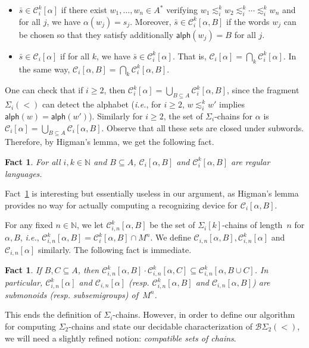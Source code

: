 \documentclass[envcountsame]{llncs}
\newcommand\nat{\ensuremath{\mathbb{N}}\xspace}
\newcommand\Cs{\ensuremath{\mathcal{C}}\xspace}
\newcommand\Csik{\ensuremath{\Cs_i^k}\xspace}
\newcommand\Csi{\ensuremath{\Cs_i}\xspace}
\newcommand\Csikn{\ensuremath{\Cs_{i,n}^k}\xspace}
\newcommand\Csin{\ensuremath{\Cs_{i,n}}\xspace}
\newcommand{\sic}[1]{\ensuremath{\Sigma_{#1}}\xspace}
\newcommand{\bswd}{\ensuremath{\mathcal{B}\Sigma_{2}(<)}\xspace}
\newcommand{\siwi}{\ensuremath{\Sigma_{i}(<)}\xspace}
\newcommand\sieq[2]{\ensuremath{\lesssim^{#1}_{#2}}\xspace}
\newcommand\ksieq[1]{\sieq{k}{#1}}
\let\geq\geqslant
\newcommand\content[1]{\ensuremath{\contentmorphism(#1)}}
\newcommand\contentmorphism{\ensuremath{\textsf{alph}}}
\newcommand\chains{chains\xspace}
\newcommand\qchains[1]{\ensuremath{\sic{#1}}-chains\xspace}
\newcommand\qpchains[2]{\ensuremath{\sic{#1}[#2]}-chains\xspace}
\newcommand\ichains{\qchains{i}}
\newcommand\dchains{\qchains{2}}
\newcommand\ikchains{\qpchains{i}{k}}
\newtheorem{fact}[theorem]{Fact}
\begin{document}
\begin{itemize}
\item $\bar{s} \in \Csik[\alpha]$ if there exist $w_1,\dots,w_n \in A^*$
  verifying $w_1 \ksieq{i} w_2 \ksieq{i} \cdots \ksieq{i} w_n$ and for all
  $j$, we have $\alpha(w_j)=s_j$. Moreover, $\bar{s} \in \Csik[\alpha,B]$ if
  the words $w_j$ can be chosen so that they satisfy additionally
  $\content{w_j}=B$ for all $j$.
\item $\bar{s} \in \Csi[\alpha]$ if for all $k$, we have $\bar{s} \in
  \Csik[\alpha]$. That is, $\Csi[\alpha]=\bigcap_k\Csik[\alpha]$. In the same
  way, $\Csi[\alpha,B]=\bigcap_k\Csik[\alpha,B]$.
\end{itemize}

One can check that if $i\geq2$, then
$\Csik[\alpha] =
\bigcup_{B\subseteq A} \Csik[\alpha,B]$, since  the fragment $\siwi$ can
detect the alphabet (\emph{i.e.}, for $i\geq2$, $w\ksieq{i}w'$
implies $\content{w}=\content{w'}$). Similarly for $i\geq2$, the set
of \ichains for $\alpha$ is $\Csi[\alpha]=\bigcup_{B\subseteq A}
\Csi[\alpha,B]$. Observe that all these sets are closed under subwords. Therefore, by Higman's lemma, we get the
following fact.

\begin{fact} \label{fct:high}
  For all $i,k \in \nat$ and $B \subseteq A$, $\Csi[\alpha,B]$ and
  $\Csik[\alpha,B]$ are regular languages.
\end{fact}

Fact~\ref{fct:high} is interesting but essentially useless in our
argument, as Higman's lemma provides no way for actually computing a
recognizing device for $\Csi[\alpha,B]$.

For any fixed $n \in \nat$, we let  $\Csikn[\alpha,B]$ be the
set of \ikchains of length~$n$ for $\alpha,B$,
\emph{i.e.}, $\Csikn[\alpha,B]=\Csik[\alpha,B] \cap M^n$. We define
$\Csin[\alpha,B],\Csikn[\alpha]$ and $\Csin[\alpha]$ similarly. The
following fact is immediate.

\begin{fact} \label{fct:chaincomp} If $B,C\subseteq A$, then
  $\Csikn[\alpha,B]\cdot\Csikn[\alpha,C] \subseteq\Csikn[\alpha,B\cup C]$.  In
  particular, $\Csikn[\alpha]$ and $\Csin[\alpha]$ (resp. $\Csikn[\alpha,B]$
  and $\Csin[\alpha,B]$) are submonoids (resp. subsemigroups) of~$M^n$.
\end{fact}





This ends the definition of \ichains. However, in order to define our
algorithm for computing \dchains and state our decidable
characterization of \bswd, we will need a slightly refined notion:
\emph{compatible sets of \chains}.
\end{document}
